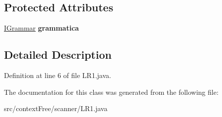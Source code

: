 \subsection*{Protected Attributes}
\begin{DoxyCompactItemize}
\item 
\hypertarget{classcontext_free_1_1scanner_1_1_l_r1_ac13fc5603c8a3b0fb8c423aff97d7350}{\hyperlink{interfacecontext_free_1_1grammar_1_1_i_grammar}{I\-Grammar} {\bfseries grammatica}}\label{classcontext_free_1_1scanner_1_1_l_r1_ac13fc5603c8a3b0fb8c423aff97d7350}

\end{DoxyCompactItemize}


\subsection{Detailed Description}


Definition at line 6 of file L\-R1.\-java.



The documentation for this class was generated from the following file\-:\begin{DoxyCompactItemize}
\item 
src/context\-Free/scanner/L\-R1.\-java\end{DoxyCompactItemize}
